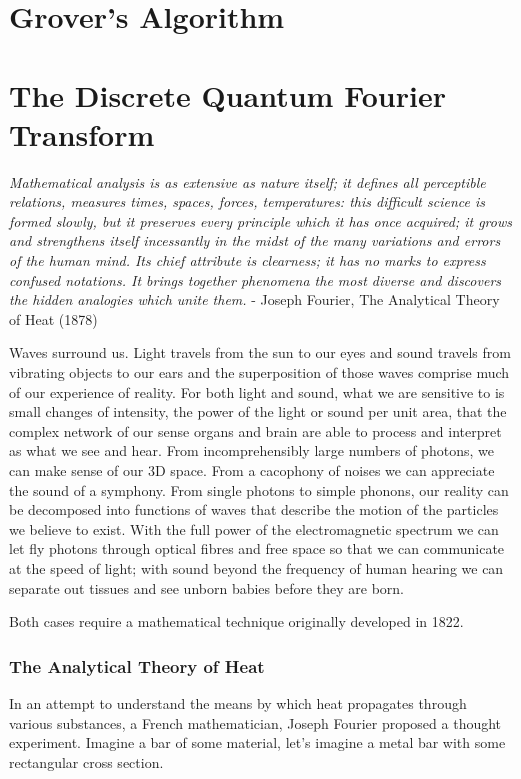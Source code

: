 \documentclass{book}
\begin{document}
\chapter{Grover's Algorithm}

\chapter{The Discrete Quantum Fourier Transform}

\textit{Mathematical analysis is as extensive as nature itself; it defines all perceptible relations, measures times, spaces, forces, temperatures: this difficult science is formed slowly, but it preserves every principle which it has once acquired; it grows and strengthens itself incessantly in the midst of the many variations and errors of the human mind. Its chief attribute is clearness; it has no marks to express confused notations. It brings together phenomena the most diverse and discovers the hidden analogies which unite them.} - Joseph Fourier, The Analytical Theory of Heat (1878) 

Waves surround us. Light travels from the sun to our eyes and sound travels from vibrating objects to our ears and the superposition of those waves comprise much of our experience of reality. For both light and sound, what we are sensitive to is small changes of intensity, the power of the light or sound per unit area, that the complex network of our sense organs and brain are able to process and interpret as what we see and hear. From incomprehensibly large numbers of photons, we can make sense of our 3D space. From a cacophony of noises we can appreciate the sound of a symphony. From single photons to simple phonons, our reality can be decomposed into functions of waves that describe the motion of the particles we believe to exist. With the full power of the electromagnetic spectrum we can let fly photons through optical fibres and free space so that we can communicate at the speed of light; with sound beyond the frequency of human hearing we can separate out tissues and see unborn babies before they are born. 

Both cases require a mathematical technique originally developed in 1822. 

\subsection{The Analytical Theory of Heat}

In an attempt to understand the means by which heat propagates through various substances, a French mathematician, Joseph Fourier proposed a thought experiment. Imagine a bar of some material, let's imagine a metal bar with some rectangular cross section. 
\end{document}
